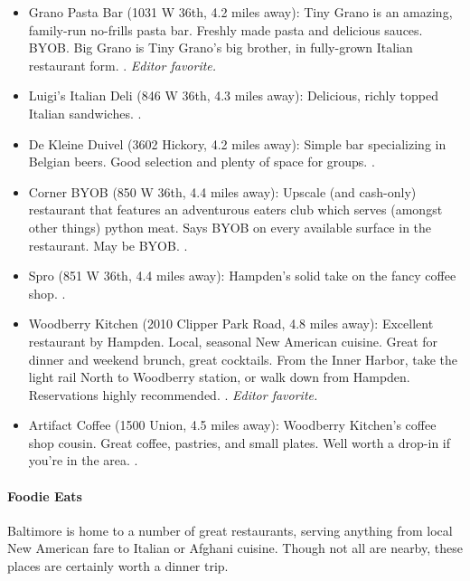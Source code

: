 \begin{itemize}
\item{Grano Pasta Bar (1031 W 36th, 4.2 miles away): Tiny Grano is an amazing, family-run no-frills pasta bar. Freshly made pasta and delicious sauces. BYOB. Big Grano is Tiny Grano's big brother, in fully-grown Italian restaurant form. \gradstudent. \it{Editor favorite}.}

\item{Luigi's Italian Deli (846 W 36th, 4.3 miles away): Delicious, richly topped Italian sandwiches. \gradstudent.}

\item{De Kleine Duivel (3602 Hickory, 4.2 miles away): Simple bar specializing in Belgian beers. Good selection and plenty of space for groups. \gradstudent.}

\item{Corner BYOB (850 W 36th, 4.4 miles away): Upscale (and cash-only) restaurant that features an adventurous eaters club which serves (amongst other things) python meat. Says BYOB on every available surface in the restaurant. May be BYOB. \professor.}

\item{Spro (851 W 36th, 4.4 miles away): Hampden's solid take on the fancy coffee shop. \gradstudent.}

\item{Woodberry Kitchen (2010 Clipper Park Road, 4.8 miles away): Excellent restaurant by Hampden. Local, seasonal New American cuisine. Great for dinner and weekend brunch, great cocktails. From the Inner Harbor, take the light rail North to Woodberry station, or walk down from Hampden. Reservations highly recommended.  \professor. \it{Editor favorite}.}

\item{Artifact Coffee (1500 Union, 4.5 miles away): Woodberry Kitchen's coffee shop cousin. Great coffee, pastries, and small plates. Well worth a drop-in if you're in the area. \postdoc.}

\end{itemize}

\paragraph*{Foodie Eats}

Baltimore is home to a number of great restaurants, serving anything from local New American fare to Italian or Afghani cuisine. Though not all are nearby, these places are certainly worth a dinner trip.

